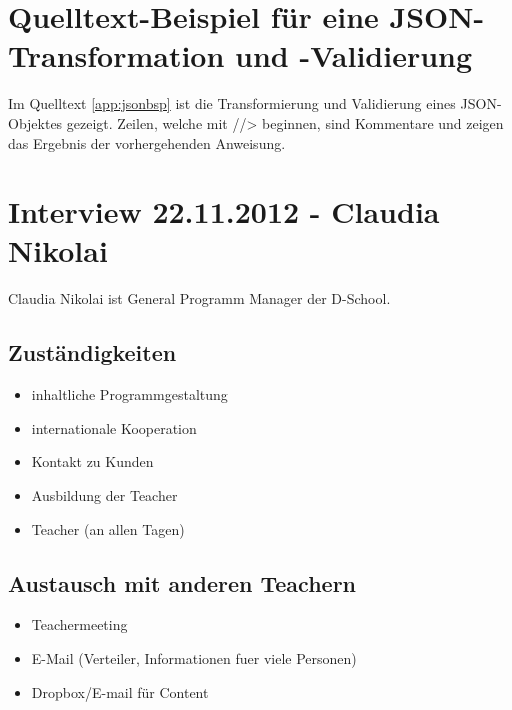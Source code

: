 \label{app:anhang}

\section{Quelltext-Beispiel für eine JSON-Transformation und -Validierung}
Im Quelltext \ref{app:jsonbsp} ist die Transformierung und Validierung eines JSON-Objektes gezeigt. Zeilen, welche mit \textsc{//>} beginnen, sind Kommentare und zeigen das Ergebnis der vorhergehenden Anweisung.



\section{Interview 22.11.2012 - Claudia Nikolai }
\label{sec:interview_nikolai}
Claudia Nikolai ist General Programm Manager der D-School.

\subsection*{Zuständigkeiten}
\label{zustaendigkeiten}

\begin{itemize}
\item inhaltliche Programmgestaltung
\item internationale Kooperation
\item Kontakt zu Kunden
\item Ausbildung der Teacher
\item Teacher (an allen Tagen)
\end{itemize}

\subsection*{Austausch mit anderen Teachern}
\label{austauschmitanderenteachern}

\begin{itemize}
\item Teachermeeting
\item E-Mail (Verteiler, Informationen fuer viele Personen)
\item Dropbox\slash E-mail für Content
\end{itemize}

